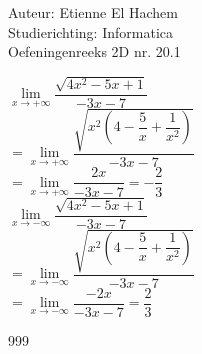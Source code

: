 \documentclass[a4paper]{article}
\begin{document}
  
\noindent \large Auteur: Etienne El Hachem \\
\noindent \large Studierichting: Informatica\\
\noindent \large Oefeningenreeks 2D nr. 20.1\\

\medskip

\normalsize

$\lim\limits_{x \rightarrow +\infty} \dfrac{\sqrt{4x^2 - 5x + 1}}{-3x - 7}$\\

$= \lim\limits_{x \rightarrow +\infty} \dfrac{\sqrt{x^2\left(4 - \dfrac{5}{x} + \dfrac{1}{x^2}\right)}}{-3x - 7}$\\

$= \lim\limits_{x \rightarrow +\infty} \dfrac{2x}{-3x - 7} = -\dfrac{2}{3}$\\


$\lim\limits_{x \rightarrow -\infty} \dfrac{\sqrt{4x^2 - 5x + 1}}{-3x - 7}$\\

$= \lim\limits_{x \rightarrow -\infty} \dfrac{\sqrt{x^2\left(4 - \dfrac{5}{x} + \dfrac{1}{x^2}\right)}}{-3x - 7}$\\

$= \lim\limits_{x \rightarrow -\infty} \dfrac{-2x}{-3x - 7} = \dfrac{2}{3}$



\begin{thebibliography}{999}
\end{thebibliography}
\end{document}
